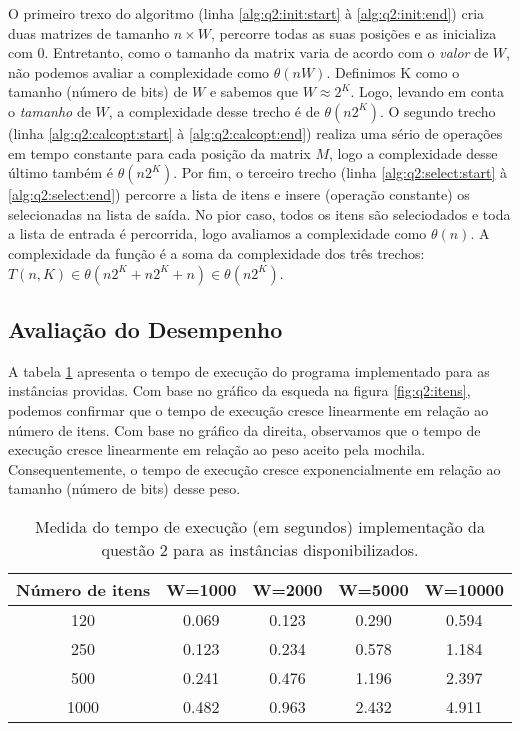 \documentclass[a4paper]{article}
\newcommand{\algsection}[2]{(linha \ref{alg:#1:#2:start} à \ref{alg:#1:#2:end})}
\begin{document}
O primeiro trexo do algoritmo \algsection{q2}{init} cria duas matrizes de tamanho $n \times W$, percorre todas as suas posições e as inicializa com 0. Entretanto, como o tamanho da matrix varia de acordo com o \emph{valor} de $W$, não podemos avaliar a complexidade como $\theta(nW)$. Definimos K como o tamanho (número de bits) de $W$ e sabemos que $W \approx 2^K$. Logo, levando em conta o \emph{tamanho} de $W$, a complexidade desse trecho é de $\theta(n2^K)$. O segundo trecho \algsection{q2}{calcopt} realiza uma sério de operações em tempo constante para cada posição da matrix $M$, logo a complexidade desse último também é $\theta(n2^K)$. Por fim, o terceiro trecho \algsection{q2}{select} percorre a lista de itens e insere (operação constante) os selecionadas na lista de saída. No pior caso, todos os itens são seleciodados e toda a lista de entrada é percorrida, logo avaliamos a complexidade como $\theta(n)$. A complexidade da função é a soma da complexidade dos três trechos: $T(n, K) \in \theta(n2^K + n2^K + n) \in \theta(n2^K)$.

\subsection{Avaliação do Desempenho}

A tabela \ref{tab:q2:bench} apresenta o tempo de execução do programa implementado para as instâncias providas.
Com base no gráfico da esqueda na figura \ref{fig:q2:itens}, podemos confirmar que o tempo de execução cresce linearmente em relação ao número de itens. Com base no gráfico da direita, observamos que o tempo de execução cresce linearmente em relação ao peso aceito pela mochila. Consequentemente, o tempo de execução cresce exponencialmente em relação ao tamanho (número de bits) desse peso.

\begin{table}[H]
\centering
\begin{tabular}{c|c|c|c|c}
Número de itens & W=1000 & W=2000 & W=5000 & W=10000 \\
\hline
120 & 0.069& 0.123& 0.290& 0.594 \\
250 & 0.123& 0.234& 0.578& 1.184 \\
500 & 0.241& 0.476& 1.196& 2.397 \\
1000 & 0.482& 0.963& 2.432& 4.911 \\
\end{tabular}
\caption{Medida do tempo de execução (em segundos) implementação da questão 2 para as instâncias disponibilizados.}
\label{tab:q2:bench}
\end{table}
\end{document}

